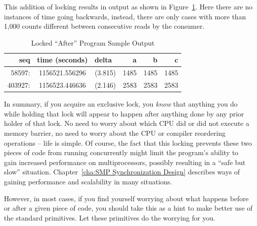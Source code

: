 This addition of locking results in output as shown in
Figure~\ref{fig:app:questions:Locked After Program Sample Output}.
Here there are no instances of time going backwards, instead,
there are only cases with more than 1,000 counts different between
consecutive reads by the consumer.

\begin{table}[htbp]
{ \scriptsize
\begin{tabular}{rcrrrr}
seq    & time (seconds) & delta~    &  a &  b &  c \\
\hline
58597:  & 1156521.556296 & (3.815) & 1485 & 1485 & 1485 \\
403927: & 1156523.446636 & (2.146) & 2583 & 2583 & 2583 \\
\end{tabular}
}
\caption{Locked ``After'' Program Sample Output}
\label{fig:app:questions:Locked After Program Sample Output}
\end{table}

 \QuickQuizEnd

In summary, if you acquire an exclusive lock, you {\em know} that
anything you do while holding that lock will appear to happen after
anything done by any prior holder of that lock.
No need to worry about which CPU did or did not execute a memory
barrier, no need to worry about the CPU or compiler reordering
operations -- life is simple.
Of course, the fact that this locking prevents these two pieces of
code from running concurrently might limit the program's ability
to gain increased performance on multiprocessors, possibly resulting
in a ``safe but slow'' situation.
Chapter~\ref{cha:SMP Synchronization Design} describes ways of
gaining performance and scalability in many situations.

However, in most cases, if you find yourself worrying about what happens
before or after a given piece of code, you should take this as a hint to
make better use of the standard primitives.
Let these primitives do the worrying for you.
